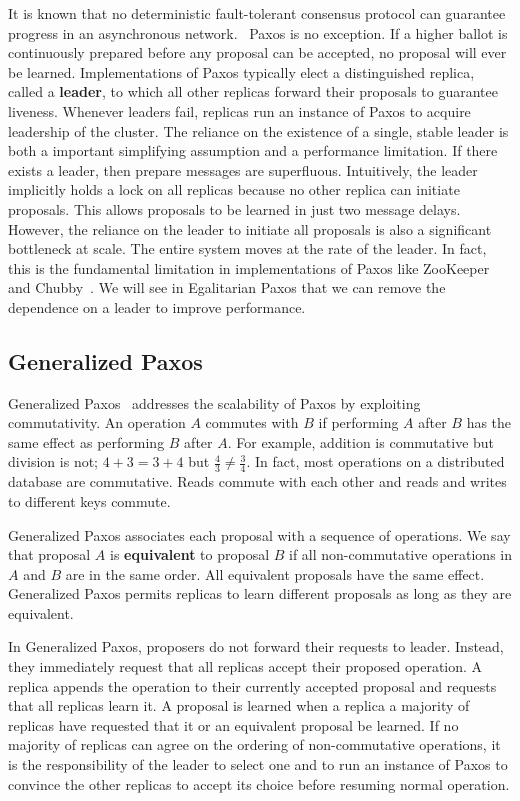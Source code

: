 \documentclass[../main.tex]{subfiles}
\begin{document}
  It is known that no deterministic fault-tolerant consensus protocol can guarantee progress in an
  asynchronous network.~\cite{consensus} Paxos is no exception. If a higher ballot is continuously
  prepared before any proposal can be accepted, no proposal will ever be learned. Implementations of
  Paxos typically elect a distinguished replica, called a \textbf{leader}, to which all other
  replicas forward their proposals to guarantee liveness. Whenever leaders fail, replicas run an
  instance of Paxos to acquire leadership of the cluster. The reliance on the existence of a single,
  stable leader is both a important simplifying assumption and a performance limitation. If there
  exists a leader, then prepare messages are superfluous. Intuitively, the leader implicitly holds
  a lock on all replicas because no other replica can initiate proposals. This allows proposals to
  be learned in just two message delays. However, the reliance on the leader to initiate all
  proposals is also a significant bottleneck at scale. The entire system moves at the rate of the
  leader. In fact, this is the fundamental limitation in implementations of Paxos like ZooKeeper
  ~\cite{zookeeper} and Chubby~\cite{chubby}. We will see in Egalitarian Paxos that we can remove
  the dependence on a leader to improve performance.

  \subsection{Generalized Paxos}
  Generalized Paxos~\cite{generalized-paxos} addresses the scalability of Paxos by exploiting
  commutativity. An operation $A$ commutes with $B$ if performing $A$ after $B$ has the same effect
  as performing $B$ after $A$. For example, addition is commutative but division is not;
  $4 + 3 = 3 + 4$ but $\frac{4}{3} \ne \frac{3}{4}$. In fact, most operations on a distributed
  database are commutative. Reads commute with each other and reads and writes to different keys
  commute.

  Generalized Paxos associates each proposal with a sequence of operations. We say that proposal $A$
  is \textbf{equivalent} to proposal $B$ if all non-commutative operations in $A$ and $B$ are in the
  same order. All equivalent proposals have the same effect. Generalized Paxos permits replicas to
  learn different proposals as long as they are equivalent.

  In Generalized Paxos, proposers do not forward their requests to leader. Instead, they immediately
  request that all replicas accept their proposed operation. A replica appends the operation to
  their currently accepted proposal and requests that all replicas learn it. A proposal is learned
  when a replica a majority of replicas have requested that it or an equivalent proposal be learned.
  If no majority of replicas can agree on the ordering of non-commutative operations, it is the
  responsibility of the leader to select one and to run an instance of Paxos to convince the other
  replicas to accept its choice before resuming normal operation.
\end{document}
